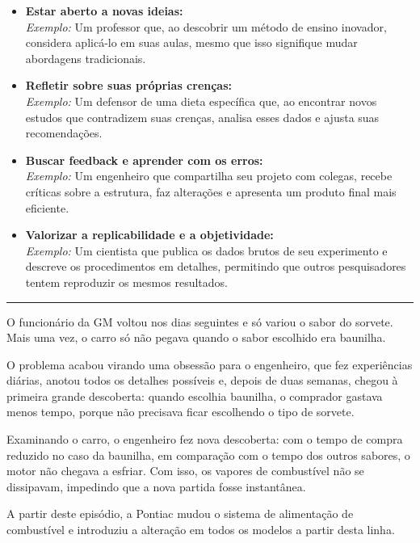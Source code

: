 \documentclass[
]{book}
\begin{document}
\begin{itemize}
\item[$\square$]
  \textbf{Estar aberto a novas ideias:}\\
  \emph{Exemplo:} Um professor que, ao descobrir um método de ensino inovador, considera aplicá-lo em suas aulas, mesmo que isso signifique mudar abordagens tradicionais.
\item[$\square$]
  \textbf{Refletir sobre suas próprias crenças:}\\
  \emph{Exemplo:} Um defensor de uma dieta específica que, ao encontrar novos estudos que contradizem suas crenças, analisa esses dados e ajusta suas recomendações.
\item[$\square$]
  \textbf{Buscar feedback e aprender com os erros:}\\
  \emph{Exemplo:} Um engenheiro que compartilha seu projeto com colegas, recebe críticas sobre a estrutura, faz alterações e apresenta um produto final mais eficiente.
\item[$\square$]
  \textbf{Valorizar a replicabilidade e a objetividade:}\\
  \emph{Exemplo:} Um cientista que publica os dados brutos de seu experimento e descreve os procedimentos em detalhes, permitindo que outros pesquisadores tentem reproduzir os mesmos resultados.
\end{itemize}

\begin{center}\rule{0.5\linewidth}{0.5pt}\end{center}

O funcionário da GM voltou nos dias seguintes e só variou o sabor do sorvete. Mais uma vez, o carro só não pegava quando o sabor escolhido era baunilha.

O problema acabou virando uma obsessão para o engenheiro, que fez experiências diárias, anotou todos os detalhes possíveis e, depois de duas semanas, chegou à primeira grande descoberta: quando escolhia baunilha, o comprador gastava menos tempo, porque não precisava ficar escolhendo o tipo de sorvete.

Examinando o carro, o engenheiro fez nova descoberta: com o tempo de compra reduzido no caso da baunilha, em comparação com o tempo dos outros sabores, o motor não chegava a esfriar. Com isso, os vapores de combustível não se dissipavam, impedindo que a nova partida fosse instantânea.

A partir deste episódio, a Pontiac mudou o sistema de alimentação de combustível e introduziu a alteração em todos os modelos a partir desta linha.
\end{document}
